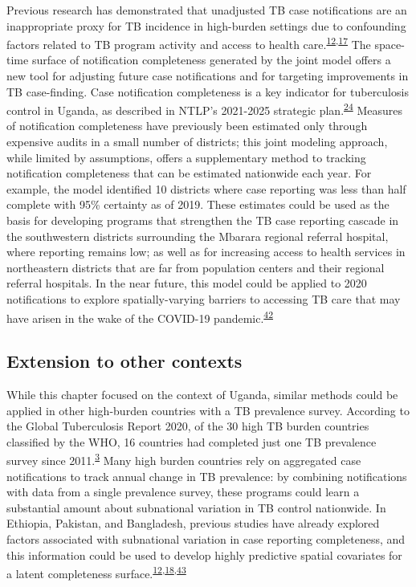 \documentclass[
]{article}
\begin{document}
Previous research has demonstrated that unadjusted TB case notifications are an inappropriate proxy for TB incidence in high-burden settings due to confounding factors related to TB program activity and access to health care.\textsuperscript{\protect\hyperlink{ref-Rood2019}{12},\protect\hyperlink{ref-Shaweno2018}{17}} The space-time surface of notification completeness generated by the joint model offers a new tool for adjusting future case notifications and for targeting improvements in TB case-finding. Case notification completeness is a key indicator for tuberculosis control in Uganda, as described in NTLP's 2021-2025 strategic plan.\textsuperscript{\protect\hyperlink{ref-UgandaNationalTuberculosisandLeprosyProgramme2020a}{24}} Measures of notification completeness have previously been estimated only through expensive audits in a small number of districts; this joint modeling approach, while limited by assumptions, offers a supplementary method to tracking notification completeness that can be estimated nationwide each year. For example, the model identified 10 districts where case reporting was less than half complete with 95\% certainty as of 2019. These estimates could be used as the basis for developing programs that strengthen the TB case reporting cascade in the southwestern districts surrounding the Mbarara regional referral hospital, where reporting remains low; as well as for increasing access to health services in northeastern districts that are far from population centers and their regional referral hospitals. In the near future, this model could be applied to 2020 notifications to explore spatially-varying barriers to accessing TB care that may have arisen in the wake of the COVID-19 pandemic.\textsuperscript{\protect\hyperlink{ref-Togun2020}{42}}

\hypertarget{extension-to-other-contexts}{%
\subsection{Extension to other contexts}\label{extension-to-other-contexts}}

While this chapter focused on the context of Uganda, similar methods could be applied in other high-burden countries with a TB prevalence survey. According to the Global Tuberculosis Report 2020, of the 30 high TB burden countries classified by the WHO, 16 countries had completed just one TB prevalence survey since 2011.\textsuperscript{\protect\hyperlink{ref-WorldHealthOrganization2020a}{3}} Many high burden countries rely on aggregated case notifications to track annual change in TB prevalence: by combining notifications with data from a single prevalence survey, these programs could learn a substantial amount about subnational variation in TB control nationwide. In Ethiopia, Pakistan, and Bangladesh, previous studies have already explored factors associated with subnational variation in case reporting completeness, and this information could be used to develop highly predictive spatial covariates for a latent completeness surface.\textsuperscript{\protect\hyperlink{ref-Rood2019}{12},\protect\hyperlink{ref-VanGurp2020}{18},\protect\hyperlink{ref-Shaweno2017}{43}}
\end{document}
